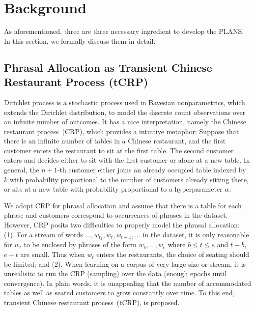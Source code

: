 \section{Background}

As aforementioned, three are three necessary ingredient to develop the PLANS. In
this section, we formally discuss them in detail.

\subsection{Phrasal Allocation as Transient Chinese Restaurant Process (tCRP)}

Dirichlet process is a stochastic process used in Bayesian nonparametrics, which
extends the Dirichlet distribution, to model the discrete count observations
over an infinite number of outcomes. It has a nice interpretation, namely the
Chinese restaurant process~(CRP), which provides a intuitive metaphor: Suppose
that there is an infinite number of tables in a Chinese restaurant, and the
first customer enters the restaurant to sit at the first table. The second
customer enters and decides either to sit with the first customer or alone at a
new table. In general, the $n+1$-th customer either joins an already occupied
table indexed by $k$ with probability proportional to the number of customers
already sitting there, or sits at a new table with probability proportional to a
hyperparameter $\alpha$.

We adopt CRP for phrasal allocation and assume that there is a table for each
phrase and customers correspond to occurrences of phrases in the dataset.
However, CRP posits two difficulties to properly model the phrasal allocation:
(1). For a stream of words $\dots, w_{t_1}, w_t, w_{t+1}, \dots$ in the dataset,
it is only reasonable for $w_t$ to be enclosed by phrases of the form $w_b,
\dots, w_e$ where $b \le t \le e$ and $t - b$, $e - t$ are small.  Thus when
$w_t$ enters the restaurants, the choice of seating should be limited; and (2).
When learning on a corpus of very large size or stream, it is unrealistic to run
the CRP (sampling) over the data (enough epochs until convergence). In plain
words, it is unappealing that the number of accommodated tables as well as
seated customers to grow constantly over time. To this end, transient Chinese
restaurant process~(tCRP), is proposed.

